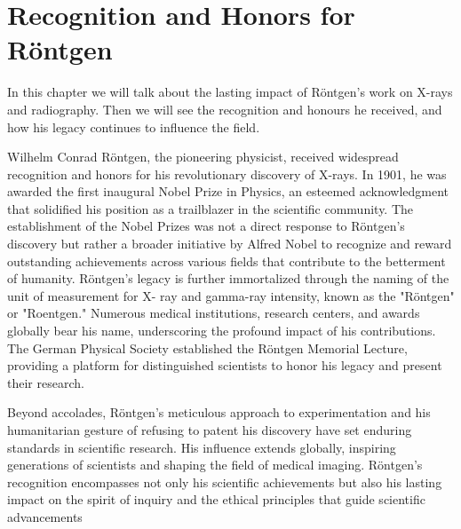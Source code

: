 \documentclass[a4paper,12pt]{report}
\begin{document}
\section{Recognition and Honors for Röntgen}
In this chapter we will talk about the lasting impact of Röntgen's work on X-rays and radiography. Then we will see the recognition and honours he received, and how his legacy continues to influence the field.

Wilhelm Conrad Röntgen, the pioneering physicist, received widespread recognition and honors
for his revolutionary discovery of X-rays. In 1901, he was awarded the first inaugural Nobel
Prize in Physics, an esteemed acknowledgment that solidified his position as a trailblazer in the
scientific community. The establishment of the Nobel Prizes was not a direct response to
Röntgen's discovery but rather a broader initiative by Alfred Nobel to recognize and reward
outstanding achievements across various fields that contribute to the betterment of humanity.
Röntgen's legacy is further immortalized through the naming of the unit of measurement for X-
ray and gamma-ray intensity, known as the "Röntgen" or "Roentgen." Numerous medical
institutions, research centers, and awards globally bear his name, underscoring the profound
impact of his contributions. The German Physical Society established the Röntgen Memorial
Lecture, providing a platform for distinguished scientists to honor his legacy and present their
research. 

Beyond accolades, Röntgen's meticulous approach to experimentation and his
humanitarian gesture of refusing to patent his discovery have set enduring standards in scientific
research. His influence extends globally, inspiring generations of scientists and shaping the field
of medical imaging. Röntgen's recognition encompasses not only his scientific achievements but
also his lasting impact on the spirit of inquiry and the ethical principles that guide scientific
advancements
\end{document}
